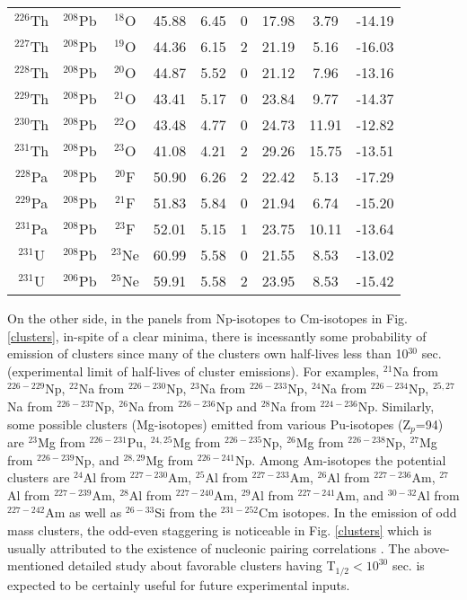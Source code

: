 \documentclass[preprint,10pt]{elsarticle}
\begin{document}
\begin{table*}[!htbp]
{\begin{tabular}{ccccccccc}
$^{226}$Th& $^{208}$Pb & $^{18}$O  & 45.88  & 6.45& 0 &17.98 &3.79  &-14.19  \\
$^{227}$Th& $^{208}$Pb & $^{19}$O  & 44.36  & 6.15& 2 &21.19 &5.16  &-16.03  \\
$^{228}$Th& $^{208}$Pb & $^{20}$O  & 44.87  & 5.52& 0 &21.12 &7.96  &-13.16  \\
$^{229}$Th& $^{208}$Pb & $^{21}$O  & 43.41  & 5.17& 0 &23.84 &9.77  &-14.37  \\
$^{230}$Th& $^{208}$Pb & $^{22}$O  & 43.48  & 4.77& 0 &24.73 &11.91 &-12.82  \\
$^{231}$Th& $^{208}$Pb & $^{23}$O  & 41.08  & 4.21& 2 &29.26 &15.75 &-13.51  \\
$^{228}$Pa& $^{208}$Pb & $^{20}$F  & 50.90  & 6.26& 2 &22.42 &5.13  &-17.29  \\
$^{229}$Pa& $^{208}$Pb & $^{21}$F  & 51.83  & 5.84& 0 &21.94 &6.74  &-15.20  \\
$^{231}$Pa& $^{208}$Pb & $^{23}$F  & 52.01  & 5.15& 1 &23.75 &10.11 &-13.64  \\
$^{231}$U & $^{208}$Pb & $^{23}$Ne & 60.99  & 5.58& 0 &21.55 &8.53  &-13.02  \\
$^{231}$U & $^{206}$Pb & $^{25}$Ne & 59.91  & 5.58& 2 &23.95 &8.53  &-15.42   \\

\hline \end{tabular}}
\label{Probable}
\end{table*}

On the other side, in the panels from Np-isotopes to Cm-isotopes in Fig. \ref{clusters}, in-spite of a clear minima, there is incessantly some probability of emission of clusters since many of the clusters own half-lives less than 10$^{30}$ sec. (experimental limit of half-lives of cluster emissions). For examples, $^{21}$Na from $^{226-229}$Np, $^{22}$Na from $^{226-230}$Np, $^{23}$Na from $^{226-233}$Np, $^{24}$Na from $^{226-234}$Np, $^{25,27}$Na from $^{226-237}$Np, $^{26}$Na from $^{226-236}$Np and $^{28}$Na from $^{224-236}$Np. Similarly, some possible clusters (Mg-isotopes) emitted from various Pu-isotopes (Z$_{p}$=94) are $^{23}$Mg from $^{226-231}$Pu, $^{24,25}$Mg from $^{226-235}$Np, $^{26}$Mg from $^{226-238}$Np, $^{27}$Mg from $^{226-239}$Np, and $^{28,29}$Mg from $^{226-241}$Np. Among Am-isotopes the potential clusters are $^{24}$Al from $^{227-230}$Am, $^{25}$Al from $^{227-233}$Am, $^{26}$Al from $^{227-236}$Am, $^{27}$Al from $^{227-239}$Am, $^{28}$Al from $^{227-240}$Am, $^{29}$Al from $^{227-241}$Am, and $^{30-32}$Al from $^{227-242}$Am as well as $^{26-33}$Si from the $^{231-252}$Cm isotopes. In the emission of odd mass clusters, the odd-even staggering is noticeable in Fig. \ref{clusters} which is usually attributed to the existence of nucleonic pairing correlations \cite{Friedman2009}. The above-mentioned detailed study about favorable clusters having T$_{1/2}<10^{30}$ sec. is expected to be certainly useful for future experimental inputs.
\end{document}
